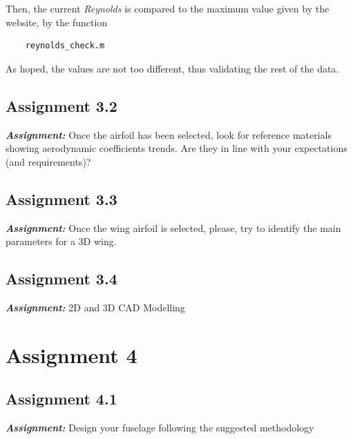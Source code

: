 \documentclass{article}
\begin{document}
Then, the current \textit{Reynolds} is compared to the maximum value given by the website, by the function

\begin{verbatim}
    reynolds_check.m
\end{verbatim}

As hoped, the values are not too different, thus validating the rest of the data.\\ 
\clearpage

\subsection{Assignment 3.2\label{Assignment_3.2}}

\textbf{\textit{Assignment:}} Once the airfoil has been selected, look for reference materials
showing aerodynamic coefficients trends. 
Are they in line with your expectations (and requirements)? 



\clearpage

\subsection{Assignment 3.3\label{Assignment_3.3}}

\textbf{\textit{Assignment:}} Once the wing airfoil is selected, please, 
try to identify the main parameters for a 3D wing. 
\clearpage 
\subsection{Assignment 3.4\label{Assignment_3.4}}

\textbf{\textit{Assignment:}} 2D and 3D CAD Modelling 

\clearpage 

\section{Assignment 4\label{Assignment_4}}

\subsection{Assignment 4.1\label{Assignment_4.1}}

\textbf{\textit{Assignment:}} Design your fuselage following the suggested methodology\\ \\ \\ 
\end{document}
